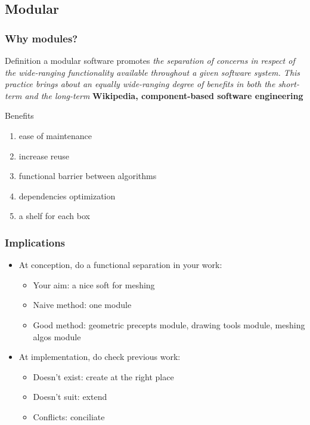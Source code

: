 \documentclass[pdf]{beamer}
\begin{document}
\subsection{Modular}
\begin{frame}
  \frametitle{Why modules?}
  \begin{block}{Definition} 
    a modular software promotes \textit{the separation of concerns in respect of the wide-ranging functionality available throughout a given software system. This practice brings about an equally wide-ranging degree of benefits in both the short-term and the long-term} \textbf{Wikipedia, component-based software engineering}
  \end{block}
  \pause
  \begin{block}{Benefits}
    \begin{enumerate}
      \item ease of maintenance
      \item increase reuse
      \item functional barrier between algorithms
      \item dependencies optimization
      \item a shelf for each box
    \end{enumerate}
  \end{block}
  \end{frame}
  \begin{frame}
    \frametitle{Implications}
    \begin{itemize}
      \item<1->At conception, do a functional separation in your work:
        \begin{itemize}
        \item<2-> Your aim: a nice soft for meshing
        \item<3->\alert<4->{Naive method: one module}
        \item<4-> Good method: geometric precepts module, drawing tools module, meshing algos module
        \end{itemize}
      \item<5-> At implementation, do check previous work:
        \begin{itemize}
        \item<6-> Doesn't exist: create at the right place
        \item<7-> Doesn't suit: extend
        \item<8-> Conflicts: conciliate
        \end{itemize}
      \end{itemize}
  \end{frame}
\end{document}
